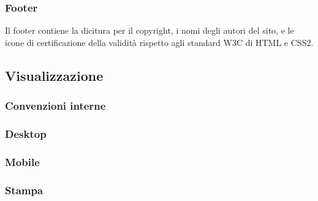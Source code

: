 \subsubsection{Footer}
\label{ssub:footer}
Il footer contiene la dicitura per il copyright, i nomi degli autori del sito, e le icone di certificazione della validità rispetto agli standard W3C di HTML e CSS2.

\subsection{Visualizzazione} %
\label{sub:visualizzazione}
\subsubsection{Convenzioni interne}
\label{ssub:convenzioni_interne}

\subsubsection{Desktop}
\label{ssub:desktop}

\subsubsection{Mobile}
\label{ssub:mobile}

\subsubsection{Stampa}
\label{ssub:stampa}

